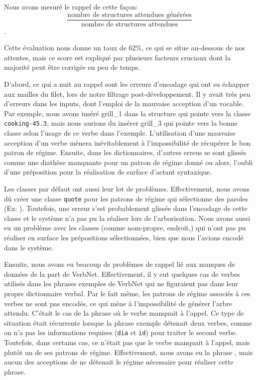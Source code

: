 Nous avons mesuré le rappel de cette façon: 
\[\frac{\text{nombre de structures attendues générées}}{\text{nombre de structures attendues}}\].

Cette évaluation nous donne un taux de 62\%, ce qui se situe au-dessous de nos attentes, mais ce score est expliqué par plusieurs facteurs cruciaux dont la majorité peut être corrigée en peu de temps. 

D'abord, ce qui a nuit au rappel sont les erreurs d'encodage qui ont su échapper aux mailles du filet, lors de notre filtrage post-développement. Il y avait très peu d'erreurs dans les inputs, dont l'emploi de la mauvaise acception d'un vocable. Par exemple, nous avons inséré grill\_1 dans la structure qui pointe vers la classe \texttt{cooking-45.3}, mais nous aurions du insérer grill\_3 qui pointe vers la bonne classe selon l'usage de ce verbe dans l'exemple. L'utilisation d'une mauvaise acception d'un verbe mènera inévitablement à l'impossibilité de récupérer le bon patron de régime. Ensuite, dans les dictionnaires, d'autres erreus se sont glissés comme une diathèse manquante pour un patron de régime donné ou alors, l'oubli d'une préposition pour la réalisation de surface d'actant syntaxique.

Les classes par défaut ont aussi leur lot de problèmes. Effectivement, nous avons dû créer une classe \texttt{quote} pour les patrons de régime qui sélectionne des paroles (Ex: ). Toutefois, une erreur s'est probablement glissée dans l'encodage de cette classe et le système n'a pas pu la réaliser lors de l'arborisation. Nous avons aussi eu un problème avec les classes (comme nom-propre, endroit,) qui n'ont pas pu réaliser en surface les prépositions sélectionnées, bien que nous l'avions encodé dans le système.

Ensuite, nous avons eu beacoup de problèmes de rappel lié aux manques de données de la part de VerbNet. Effectivement, il y eut quelques cas de verbes utilisés dans les phrases exemples de VerbNet qui ne figuraient pas dans leur propre dictionnaire verbal. Par le fait même, les patrons de régime associés à ces verbes ne sont pas encodés, ce qui mène à l'impossibilité de générer l'arbre attendu. C'était le cas de la phrase  où le verbe  manquait à l'appel. Ce type de situation était récurrente lorsque la phrase exemple détenait deux verbes, comme on n'a pas les informations requises (\texttt{dia} et \texttt{id}) pour traiter le second verbe. Toutefois, dans certains cas, ce n'était pas que le verbe manquait à l'appel, mais plutôt un de ses patrons de régime. Effectivement, nous avons eu la phrase , mais aucun des acceptions de  ne détenait le régime nécessaire pour réaliser cette phrase.

